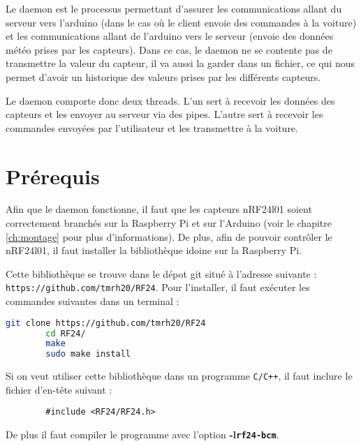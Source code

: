 Le daemon est le processus permettant d'assurer les communications 
allant du serveur vers l'arduino (dans le cas où le client envoie des commandes
à la voiture) et les communications allant de l'arduino vers le serveur (envoie
des données météo prises par les capteurs). Dans ce cas, le daemon ne se 
contente pas de transmettre la valeur du capteur, il va aussi la garder dans 
un fichier, ce qui nous permet d'avoir un historique des valeurs prises par les
différents capteurs. 

Le daemon comporte donc deux threads. L'un sert à recevoir les données des
capteurs et les envoyer au serveur via des pipes. L'autre sert à recevoir les
commandes envoyées par l'utilisateur et les transmettre à la voiture.

\section{Prérequis}

Afin que le daemon fonctionne, il faut que les capteurs nRF24l01 soient
correctement branchés sur la Raspberry Pi et sur l'Arduino (voir le chapitre 
\ref{ch:montage} pour plus d'informations). De plus, afin de pouvoir contrôler
le nRF24l01, il faut installer la bibliothèque idoine sur la Raspberry Pi.

Cette bibliothèque se trouve dans le dépot git situé à l'adresse suivante : 
\texttt{https://github.com/tmrh20/RF24}. Pour l'installer, il faut exécuter les
commandes suivantes dans un terminal : \\

\begin{DDbox}{\linewidth}
\begin{lstlisting}[language=bash]
        git clone https://github.com/tmrh20/RF24
        cd RF24/
        make
        sudo make install
\end{lstlisting}
\end{DDbox}

Si on veut utiliser cette bibliothèque dans un programme \texttt{C/C++}, il faut
inclure le fichier d'en-tête suivant : \\

\begin{DDbox}{\linewidth}
\begin{lstlisting}
        #include <RF24/RF24.h>
\end{lstlisting}
\end{DDbox}

De plus il faut compiler le programme avec l'option
\textbf{-l\texttt{rf24-bcm}}.

